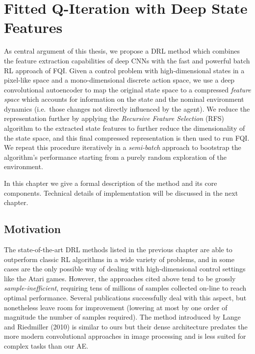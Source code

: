 \chapter{Fitted Q-Iteration with Deep State Features}
\label{ch3_setup}
\thispagestyle{empty}

\vspace{0.5cm}

As central argument of this thesis, we propose a DRL method which 
combines the feature extraction capabilities of deep CNNs with the fast and 
powerful batch RL approach of FQI. 
Given a control problem with high-dimensional states in a pixel-like space and
a mono-dimensional discrete action space, we use a deep convolutional 
autoencoder to map the original state space to a compressed 
\textit{feature space} which accounts for information on the state and the 
nominal environment dynamics (i.e.\ those changes not directly influenced by the 
agent). 
We reduce the representation further by applying the \textit{Recursive Feature
Selection} (RFS) algorithm to the extracted state features to further reduce 
the dimensionality of the state space, and this final compressed representation 
is then used to run FQI. 
We repeat this procedure iteratively in a \textit{semi-batch} approach to 
bootstrap the algorithm's performance starting from a purely random exploration
of the environment.

In this chapter we give a formal description of the method and its core 
components. Technical details of implementation will be discussed in the next
chapter.

\section{Motivation}
The state-of-the-art DRL methods listed in the previous chapter are able to 
outperform classic RL algorithms in a wide variety of problems, and in some 
cases are the only possible way of dealing with high-dimensional control 
settings like the Atari games. 
However, the approaches cited above tend to be grossly 
\textit{sample-inefficient}, requiring tens of millions of samples collected
on-line to reach optimal performance. Several publications successfully deal 
with this aspect, but nonetheless leave room for improvement (lowering at most
by one order of magnitude the number of samples required).
The method introduced by Lange and Riedmiller (2010) \cite{lange2010deep} is 
similar to ours but their dense architecture predates the more modern 
convolutional approaches in image processing and is less suited for complex
tasks than our AE.

